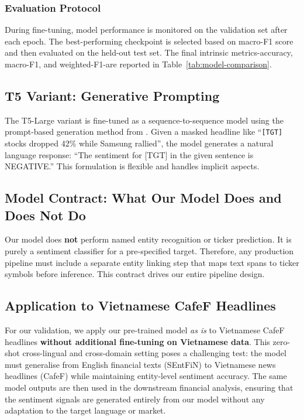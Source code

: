 \documentclass[12pt,a4paper]{article}
\begin{document}
\subsubsection{Evaluation Protocol}
During fine-tuning, model performance is monitored on the validation set after each epoch. The best-performing checkpoint is selected based on macro-F1 score and then evaluated on the held-out test set. The final intrinsic metrics-accuracy, macro-F1, and weighted-F1-are reported in Table~\ref{tab:model-comparison}.

\subsection{T5 Variant: Generative Prompting}
The T5-Large variant is fine-tuned as a sequence-to-sequence model using the prompt-based generation method from \cite{aspect-sentiment-quad-prediction}. Given a masked headline like ``\texttt{[TGT]} stocks dropped 42\% while Samsung rallied'', the model generates a natural language response: ``The sentiment for [TGT] in the given sentence is NEGATIVE.'' This formulation is flexible and handles implicit aspects.

\subsection{Model Contract: What Our Model Does and Does Not Do}
Our model does \textbf{not} perform named entity recognition or ticker prediction. It is purely a sentiment classifier for a pre-specified target. Therefore, any production pipeline must include a separate entity linking step that maps text spans to ticker symbols before inference. This contract drives our entire pipeline design.

\subsection{Application to Vietnamese CafeF Headlines}
For our validation, we apply our pre-trained model \textit{as is} to Vietnamese CafeF headlines \textbf{without additional fine-tuning on Vietnamese data}. This zero-shot cross-lingual and cross-domain setting poses a challenging test: the model must generalise from English financial texts (SEntFiN) to Vietnamese news headlines (CafeF) while maintaining entity-level sentiment accuracy. The same model outputs are then used in the downstream financial analysis, ensuring that the sentiment signals are generated entirely from our model without any adaptation to the target language or market.
\end{document}
